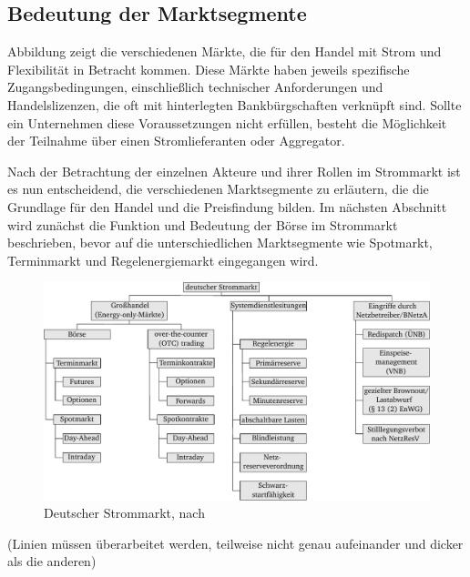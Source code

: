 \subsection{Bedeutung der Marktsegmente}

Abbildung  zeigt die verschiedenen Märkte, die für den Handel mit Strom und Flexibilität in Betracht kommen. Diese Märkte haben jeweils spezifische Zugangsbedingungen, einschließlich technischer Anforderungen und Handelslizenzen, die oft mit hinterlegten Bankbürgschaften verknüpft sind. Sollte ein Unternehmen diese Voraussetzungen nicht erfüllen, besteht die Möglichkeit der Teilnahme über einen Stromlieferanten oder Aggregator.

Nach der Betrachtung der einzelnen Akteure und ihrer Rollen im Strommarkt ist es nun entscheidend, die verschiedenen Marktsegmente zu erläutern, die die Grundlage für den Handel und die Preisfindung bilden. Im nächsten Abschnitt wird zunächst die Funktion und Bedeutung der Börse im Strommarkt beschrieben, bevor auf die unterschiedlichen Marktsegmente wie Spotmarkt, Terminmarkt und Regelenergiemarkt eingegangen wird.\\

\begin{figure}[h]
	\centering
	\includegraphics[width=400pt]{figures/03_Grundlagen/Deutscher Strommarkt.pdf}
	\caption{Deutscher Strommarkt, nach \cite{VDI5207Blatt2020}}
	\label{fig_03Deutscher Strommarkt}
\end{figure}
(Linien müssen überarbeitet werden, teilweise nicht genau aufeinander und dicker als die anderen)\\

